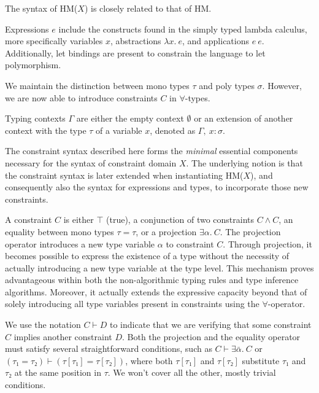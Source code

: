 \documentclass[runningheads]{llncs}
\newcommand{\hmx}{HM($X$)}
\begin{document}
The syntax of \hmx{} is closely related to that of HM.

Expressions $e$ include the constructs found in the simply typed lambda
calculus, more specifically variables $x$, abstractions $λx. \ e$, and
applications $e \
  e$.
Additionally, let bindings are present to constrain the language to let
polymorphism.

We maintain the distinction between mono types $τ$ and
poly types $σ$. However, we are now
able to introduce constraints $C$ in $∀$-types.

Typing contexts $Γ$ are either the empty context $∅$ or an extension of
another
context with the type $τ$ of a variable $x$, denoted as $Γ, \ x : σ$.

The constraint syntax described here forms the \emph{minimal} essential
components necessary for the syntax of constraint domain $X$.
The underlying notion is that the constraint syntax is later extended
when
instantiating \hmx{}, and
consequently also the syntax for expressions and types, to incorporate
those
new
constraints.

A constraint $C$ is either $⊤$ (true), a conjunction of two constraints
$C ∧ C$, an equality between mono types $τ = τ$, or a projection $∃α. \ C$.
The projection operator introduces a new type variable $α$ to constraint
$C$.
Through projection, it becomes possible to express the
existence of a type without the necessity of actually introducing a new
type variable at the type level.
This mechanism proves advantageous within both the non-algorithmic typing
rules
and
type inference algorithms.
Moreover, it actually extends the expressive capacity beyond that of
solely introducing all type variables present in constraints using
the $∀$-operator.

We use the notation $C ⊢ D$ to indicate that we are verifying that some
constraint $C$ implies another constraint $D$.
Both the projection and the equality operator must satisfy several
straightforward conditions, such as $C ⊢ ∃\bar{α}. \ C$ or $(τ₁ = τ₂) ⊢ (τ[τ₁]
  = τ[τ₂])$, where both $τ[τ₁]$ and $τ[τ₂]$ substitute $τ₁$ and $τ₂$ at the
same
position in $τ$. We won't cover all the other, mostly trivial conditions.
\end{document}
